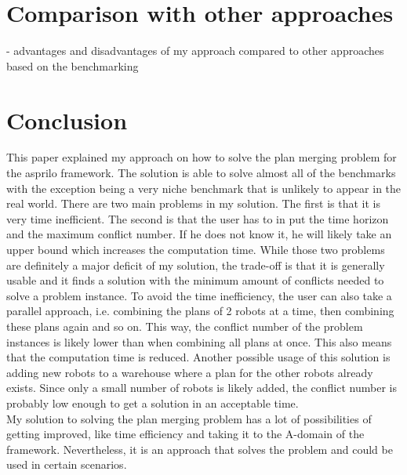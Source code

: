 \documentclass[runningheads]{llncs}
\begin{document}
\section{Comparison with other approaches}
 - advantages and disadvantages of my approach compared to other approaches based on the benchmarking

\section{Conclusion}
This paper explained my approach on how to solve the plan merging problem for the asprilo framework. The solution is able to solve almost all of the benchmarks with the exception being a very niche 
benchmark that is unlikely to appear in the real world. There are two main problems in my solution. The first is that it is very time inefficient. The second is that the user has to in put the time horizon and
the maximum conflict number. If he does not know it, he will likely take an upper bound which increases the computation time. While those two problems are definitely a major deficit of my solution, the trade-off
is that it is generally usable and it finds a solution with the minimum amount of conflicts needed to solve a problem instance. To avoid the time inefficiency, the user can also take a parallel approach, i.e. combining 
the plans of 2 robots at a time, then combining these plans again and so on. This way, the conflict number of the problem instances is likely lower than when combining all plans at once. This also means that the computation time
is reduced. Another possible usage of this solution is adding new robots to a warehouse where a plan for the other robots already exists. Since only a small number of robots is likely added, the conflict number is probably low
enough to get a solution in an acceptable time. \\
My solution to solving the plan merging problem has a lot of possibilities of getting improved, like time efficiency and taking it to the A-domain of the framework. Nevertheless, it is an approach that solves the problem and could
be used in certain scenarios.

\newpage
\end{document}
